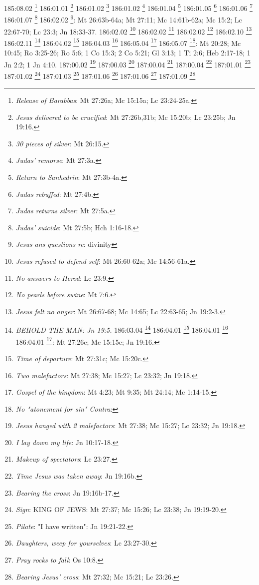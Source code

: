 {{{{{{{{{{{{{{{{{{{{{{{{{{{{{{{{{{{{{{{{{{{{{{{{{{{{{{{{{{{{{{{{{{{{{{{{{{{{{{{{{{{{{{{{{{{{{{{{185:08.02 \footnote{\textit{Release of Barabbas}: Mt 27:26a; Mc 15:15a; Lc 23:24-25a.}
186:01.01 \footnote{\textit{Jesus delivered to be crucified}: Mt 27:26b,31b; Mc 15:20b; Lc 23:25b; Jn 19:16.}
186:01.02 \footnote{\textit{30 pieces of silver}: Mt 26:15.}
186:01.02 \footnote{\textit{Judas' remorse}: Mt 27:3a.}
186:01.04 \footnote{\textit{Return to Sanhedrin}: Mt 27:3b-4a.}
186:01.05 \footnote{\textit{Judas rebuffed}: Mt 27:4b.}
186:01.06 \footnote{\textit{Judas returns silver}: Mt 27:5a.}
186:01.07 \footnote{\textit{Judas' suicide}: Mt 27:5b; Hch 1:16-18.}
186:02.02 \footnote{\textit{Jesus ans questions re}: divinity}: Mt 26:63b-64a; Mt 27:11; Mc 14:61b-62a; Mc 15:2; Lc 22:67-70; Lc 23:3; Jn 18:33-37.}
186:02.02 \footnote{\textit{Jesus refused to defend self}: Mt 26:60-62a; Mc 14:56-61a.}
186:02.02 \footnote{\textit{No answers to Herod}: Lc 23:9.}
186:02.02 \footnote{\textit{No pearls before swine}: Mt 7:6.}
186:02.10 \footnote{\textit{Jesus felt no anger}: Mt 26:67-68; Mc 14:65; Lc 22:63-65; Jn 19:2-3.}
186:02.11 \footnote{\textit{BEHOLD THE MAN: Jn 19:5.}
186:03.04 \footnote{\textit{Rise again on third day}: Mt 16:21; Mt 17:23a; Mt 20:19b; Mt 27:63; Mc 8:31; Mc 9:31; Mc 10:34b; Lc 9:22; Lc 18:33; Lc 24:7,46; Jn 20:9.}
186:04.01 \footnote{\textit{Jesus is mocked but not hit}: Mt 27:31ab; Mc 15:20ab.}
186:04.01 \footnote{\textit{Pilate washed hands}: Mt 27:24.}
186:04.01 \footnote{\textit{Pilate}: crucify him immediately}: Mt 27:26c; Mc 15:15c; Jn 19:16.}
186:04.02 \footnote{\textit{Time of departure}: Mt 27:31c; Mc 15:20c.}
186:04.03 \footnote{\textit{Two malefactors}: Mt 27:38; Mc 15:27; Lc 23:32; Jn 19:18.}
186:05.04 \footnote{\textit{Gospel of the kingdom}: Mt 4:23; Mt 9:35; Mt 24:14; Mc 1:14-15.}
186:05.07 \footnote{\textit{No "atonement for sin" Contra}:}: Mt 20:28; Mc 10:45; Ro 3:25-26; Ro 5:6; 1 Co 15:3; 2 Co 5:21; Gl 3:13; 1 Ti 2:6; Heb 2:17-18; 1 Jn 2:2; 1 Jn 4:10.}
187:00.02 \footnote{\textit{Jesus hanged with 2 malefactors}: Mt 27:38; Mc 15:27; Lc 23:32; Jn 19:18.}
187:00.03 \footnote{\textit{I lay down my life}: Jn 10:17-18.}
187:00.04 \footnote{\textit{Makeup of spectators}: Lc 23:27.}
187:00.04 \footnote{\textit{Time Jesus was taken away}: Jn 19:16b.}
187:01.01 \footnote{\textit{Bearing the cross}: Jn 19:16b-17.}
187:01.02 \footnote{\textit{Sign}: KING OF JEWS: Mt 27:37; Mc 15:26; Lc 23:38; Jn 19:19-20.}
187:01.03 \footnote{\textit{Pilate}: "I have written": Jn 19:21-22.}
187:01.06 \footnote{\textit{Daughters, weep for yourselves}: Lc 23:27-30.}
187:01.06 \footnote{\textit{Pray rocks to fall}: Os 10:8.}
187:01.09 \footnote{\textit{Bearing Jesus' cross}: Mt 27:32; Mc 15:21; Lc 23:26.}
}}}}}}}}}}}}}}}}}}}}}}}}}}}}}}}}}}}}}}}}}}}}}}}}}}}}}}}}}}}}}}}}}}}}}}}}}}}}}}}}}}}}}}}}}}}}}}
